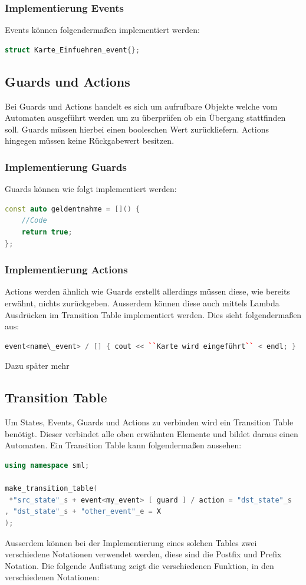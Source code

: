 \documentclass{report}
\begin{document}
\subsubsection{Implementierung Events}
Events können folgendermaßen implementiert werden:
\begin{lstlisting}[language=C++]
struct Karte_Einfuehren_event{};
\end{lstlisting}

\subsection{Guards und Actions}
Bei Guards und Actions handelt es sich um aufrufbare Objekte welche vom Automaten ausgeführt werden um zu überprüfen ob ein Übergang stattfinden soll. Guards müssen hierbei einen booleschen Wert zurückliefern. Actions hingegen müssen keine Rückgabewert besitzen.

\subsubsection{Implementierung Guards}
Guards können wie folgt implementiert werden:
\begin{lstlisting}[language=C++]
const auto geldentnahme = []() {
    //Code
    return true;
};
\end{lstlisting}

\subsubsection{Implementierung Actions}
Actions werden ähnlich wie Guards erstellt allerdings müssen diese, wie bereits erwähnt, nichts zurückgeben. Ausserdem können diese auch mittels Lambda Ausdrücken im Transition Table implementiert werden. Dies sieht folgendermaßen aus:
\begin{lstlisting}[language=C++]
event<name\_event> / [] { cout << ``Karte wird eingeführt`` < endl; }
\end{lstlisting}
Dazu später mehr

\subsection{Transition Table}
Um States, Events, Guards und Actions zu verbinden wird ein Transition Table benötigt. Dieser verbindet alle oben erwähnten Elemente und bildet daraus einen Automaten. Ein Transition Table kann folgendermaßen aussehen:
\begin{lstlisting}[language=C++]
using namespace sml;

make_transition_table(
 *"src_state"_s + event<my_event> [ guard ] / action = "dst_state"_s
, "dst_state"_s + "other_event"_e = X
);
\end{lstlisting}
\vspace{5mm}
Ausserdem können bei der Implementierung eines solchen Tables zwei verschiedene Notationen verwendet werden, diese sind die Postfix und Prefix Notation. 
\newline
Die folgende Auflistung zeigt die verschiedenen Funktion, in den verschiedenen Notationen:
\end{document}
